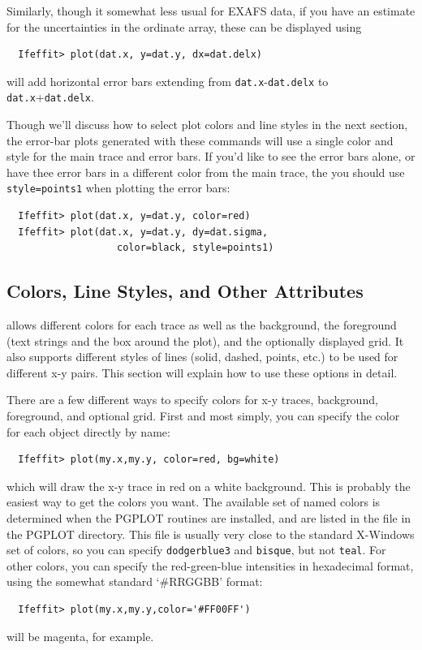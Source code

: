 Similarly, though it somewhat less usual for EXAFS data, if you have an
estimate for the uncertainties in the ordinate array, these can be
displayed using
\begin{verbatim}
  Ifeffit> plot(dat.x, y=dat.y, dx=dat.delx)
\end{verbatim}
\noindent
will add horizontal error bars extending from {\tt{dat.x}}-{\tt{dat.delx}}
to {\tt{dat.x}}+{\tt{dat.delx}}.

Though we'll discuss how to select plot colors and line styles in the next
section, the error-bar plots generated with these {} commands
will use a single color and style for the main trace and error bars.  If
you'd like to see the error bars alone, or have thee error bars in a
different color from the main trace, the you should use
{\tt{style=points1}} when plotting the error bars:
\begin{verbatim}
  Ifeffit> plot(dat.x, y=dat.y, color=red)
  Ifeffit> plot(dat.x, y=dat.y, dy=dat.sigma,
                   color=black, style=points1)
\end{verbatim}
\noindent

\subsection{Colors, Line Styles, and Other Attributes}\label{Ch:Plot-Color}

{\ifeffit} allows different colors for each trace as well as the
background, the foreground (text strings and the box around the plot), and
the optionally displayed grid.  It also supports different styles of lines
(solid, dashed, points, etc.) to be used for different x-y pairs.  This
section will explain how to use these options in detail.

There are a few different ways to specify colors for x-y traces,
background, foreground, and optional grid.  First and most simply, you can
specify the color for each object directly by name:
\begin{verbatim}
  Ifeffit> plot(my.x,my.y, color=red, bg=white)
\end{verbatim}
\noindent
which will draw the x-y trace in red on a white background.  This is
probably the easiest way to get the colors you want.  The available set of
named colors is determined when the PGPLOT routines are installed, and are
listed in the file {} in the PGPLOT directory.  This file is
usually very close to the standard X-Windows set of colors, so you can
specify {\texttt{dodgerblue3}} and {\texttt{bisque}}, but not
{\texttt{teal}}.  For other colors, you can specify the red-green-blue
intensities in hexadecimal format, using the somewhat standard `\#RRGGBB'
format:
\begin{verbatim}
  Ifeffit> plot(my.x,my.y,color='#FF00FF')
\end{verbatim}
\noindent
will be magenta, for example.
{}


